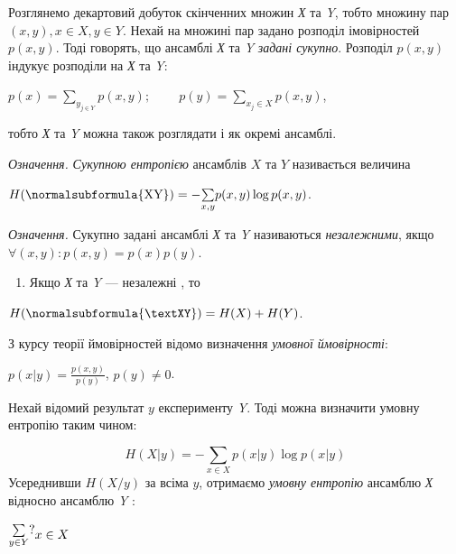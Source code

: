 \bigskip

Розглянемо декартовий добуток скінченних множин \textit{Х} та \textit{Y}, тобто
множину пар  $(x,y),x\in X,y\in Y$. Нехай на множині пар задано розподіл
імовірностей  $p(x,y)$. Тоді говорять, що ансамблі \textit{Х} та \textit{Y}
\textit{задані сукупно}. Розподіл  $p(x,y)$ індукує розподіли на \textit{Х}
та \textit{Y}:

{\centering
 ${p(x)=\underset{y_{{j}\in Y}}{\sum
}{p(x,y)};\;\;\;\;\;\;\;\;p(y)=\underset{x_{j}\in X}{\sum }{p(x,y)}}$,
\par}

тобто \textit{Х} та \textit{Y} можна також розглядати і як окремі ансамблі.

\textit{Означення.} \textit{Сукупною ентропією} ансамблів  $X$ та  $Y$
називається величина

{\centering
 ${H(\normalsubformula{\text{XY}})=-\underset{x,y}{\sum
}{p(x,y)\log p(x,y)}}$.
\par}

\textit{Означення.} Сукупно задані ансамблі \textit{Х} та \textit{Y} називаються
\textit{незалежними}, якщо  $\forall (x,y):p(x,y)=p(x)p(y)$.

\liststyleWWviiiNumxxxix
\setcounter{saveenum}{\value{enumi}}
\begin{enumerate}
\setcounter{enumi}{\value{saveenum}}
\item Якщо \textit{Х} та \textit{Y} --- незалежні , то
\end{enumerate}
{\centering
 $H(\normalsubformula{\textXY})=H(X)+H(Y)$.
\par}

З курсу теорії ймовірностей відомо визначення \textit{умовної ймовірності}:

{\centering
 $p\left(x |y \right)=\frac{p(x,y)}{p(y)}$,   $p(y)\neq 0$.
\par}

Нехай відомий результат  $y$ експерименту \textit{Y}. Тоді можна визначити
умовну ентропію таким чином:

\begin{equation*}
{H\left(X |y \right)=-\underset{x\in X}{\sum
}{p\left(x |y \right)\log p\left(x |y \right)}}
\end{equation*}
Усереднивши  $H(X/y)$ за всіма  $y$, отримаємо \textit{умовну ентропію}
ансамблю  \textit{Х } відносно ансамблю \textit{Y} :

 $\begin{matrix}\underset{y\in Y}{\sum }?\hfill\null \end{matrix}{x\in
X}\hfill $

